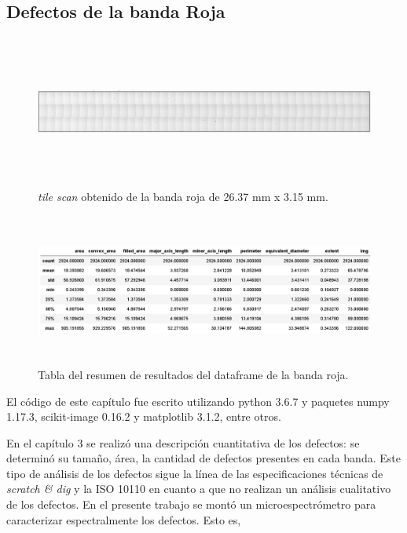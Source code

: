 \singlespacing
\subsection{Defectos de la banda Roja}


\begin{figure}[H]
	\centering
	\includegraphics[width=1.0\textwidth,height= 5.0cm]{Figs/resultados_defectos/banda_roja.png}
	\caption{\textit{tile scan} obtenido de la banda roja de 26.37 mm x 3.15 mm.}
	\label{fig:bgcel}
\end{figure}


\begin{figure}[H]
	\centering
	\includegraphics[width=1.0\textwidth,height= 5.0cm]{Figs/resultados_defectos/tabla_roja.png}
	\caption{Tabla del resumen de resultados del dataframe de la banda roja.}
	\label{fig:bgcel}
\end{figure}






El código de este capítulo fue escrito utilizando python 3.6.7 y paquetes numpy 1.17.3, scikit-image 0.16.2 y matplotlib 3.1.2, entre otros.

En el capítulo 3 se realizó una descripción cuantitativa de los defectos: se determinó su tamaño, área, la cantidad de defectos presentes en cada banda. Este tipo de análisis de los defectos sigue la línea de las especificaciones técnicas de \textit{scratch \& dig} y la ISO 10110 en cuanto a que no realizan un análisis cualitativo de los defectos. En el presente trabajo se montó un microespectrómetro para caracterizar espectralmente los defectos. Esto es,

